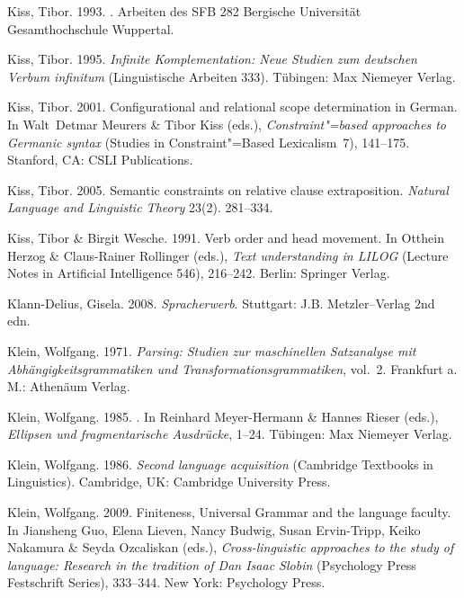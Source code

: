 \begin{thebibliography}{1420}
Kiss, Tibor. 1993.
.
\newblock Arbeiten des SFB 282  Bergische Uni\-ver\-si\-t{\"a}t
  Gesamthochschule Wuppertal.

Kiss, Tibor. 1995.
\newblock \emph{{Infinite Komplementation: Neue Studien zum deutschen Verbum
  infinitum}} (Linguistische Arbeiten 333).
\newblock T{\"u}bingen: Max Niemeyer Verlag.

Kiss, Tibor. 2001.
\newblock Configurational and relational scope determination in {German}.
\newblock In Walt~Detmar Meurers \& Tibor Kiss (eds.), \emph{Constraint"=based
  approaches to {Germanic} syntax} (Studies in Constraint"=Based Lexicalism~7),
  141--175. Stanford, CA: CSLI Publications.

Kiss, Tibor. 2005.
\newblock Semantic constraints on relative clause extraposition.
\newblock \emph{Natural Language and Linguistic Theory} 23(2). 281--334.

Kiss, Tibor \& Birgit Wesche. 1991.
\newblock Verb order and head movement.
\newblock In Otthein Herzog \& Claus-Rainer Rollinger (eds.), \emph{Text
  understanding in {LILOG}} (Lecture Notes in Artificial Intelligence 546),
  216--242. Berlin: Springer Verlag.

Klann-Delius, Gisela. 2008.
\newblock \emph{Spracherwerb}.
\newblock Stuttgart: J.B. Metzler--Verlag 2nd edn.

Klein, Wolfgang. 1971.
\newblock \emph{{Parsing: Studien zur maschinellen Satzanalyse mit
  Abh{\"a}ngigkeitsgrammatiken und Transformationsgrammatiken}}, vol.~2.
\newblock Frankfurt a.\,M.: Athen{\"a}um Verlag.

Klein, Wolfgang. 1985.
.
\newblock In Reinhard Meyer-Hermann \& Hannes Rieser (eds.), \emph{{Ellipsen
  und fragmentarische Ausdr{\"u}cke}}, 1--24. T{\"u}bingen: Max Niemeyer
  Verlag.

Klein, Wolfgang. 1986.
\newblock \emph{Second language acquisition}  (Cambridge Textbooks in
  Linguistics).
\newblock Cambridge, UK: Cambridge University Press.

Klein, Wolfgang. 2009.
\newblock Finiteness, {Universal Grammar} and the language faculty.
\newblock In Jiansheng Guo, Elena Lieven, Nancy Budwig, Susan Ervin-Tripp,
  Keiko Nakamura \& Seyda Ozcaliskan (eds.), \emph{Cross-linguistic approaches
  to the study of language: {Research} in the tradition of {Dan Isaac Slobin}}
  (Psychology Press Festschrift Series), 333--344. New York: Psychology Press.


\end{thebibliography}
